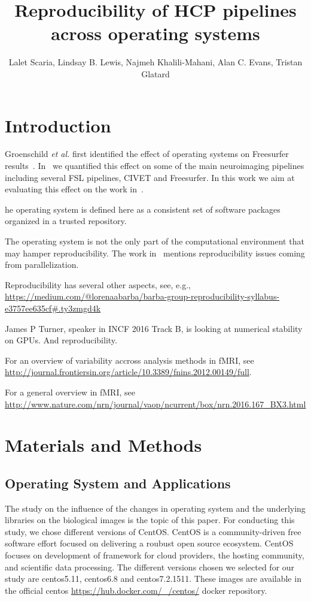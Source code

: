 \documentclass{article}
\title{Reproducibility of HCP pipelines across operating systems}
\author{Lalet Scaria, Lindsay B. Lewis, Najmeh Khalili-Mahani, Alan C. Evans, Tristan Glatard}
\newcommand{\todo}[2]{\pdfmargincomment[color=red,author=#1,open=true]{#2}}
\begin{document}
\maketitle


\section{Introduction}

Groenschild \emph{et al.} first identified the effect of operating
systems on Freesurfer results~\cite{Gronenschild2012}. In~\cite{10.3389/fninf.2015.00012} 
we quantified this effect on some of the main neuroimaging pipelines
including several FSL pipelines, CIVET and Freesurfer. In this work we
aim at evaluating this effect on the work in~\cite{glasser2015multi}.

\todo{Link this to Lindsay's HBM 2017 poster and to Redolfi et al.}

The operating system is defined here as a consistent set of software
packages organized in a trusted repository.

The operating system is not the only part of the computational
environment that may hamper reproducibility. The work
in~\cite{diethelm2012limits} mentions reproducibility issues coming
from parallelization.

Reproducibility has several other aspects, see, e.g.,
\url{https://medium.com/@lorenaabarba/barba-group-reproducibility-syllabus-e3757ee635cf#.ty3zmgd4k}

James P Turner, speaker in INCF 2016 Track B, is looking at numerical stability on GPUs. And reproducibility.

For an overview of variability accross analysis methods in fMRI, see \url{http://journal.frontiersin.org/article/10.3389/fnins.2012.00149/full}.

For a general overview in fMRI, see \url{http://www.nature.com/nrn/journal/vaop/ncurrent/box/nrn.2016.167_BX3.html}

\section{Materials and Methods}

\subsection{Operating System and Applications} 
The study on the influence of the changes in operating system and the underlying libraries on the biological images is the topic of this paper. For conducting this study, we chose different versions of CentOS. CentOS is a community-driven  free software effort focused on delivering a roubust open source ecosystem. CentOS focuses on development of framework for cloud providers, the hosting community, and scientific data processing.\cite{https://www.centos.org/about/} The different versions chosen we selected for our study are centos5.11, centos6.8 and centos7.2.1511. These images are available in the official centos \url{https://hub.docker.com/\_/centos/} docker repository.
\end{document}
